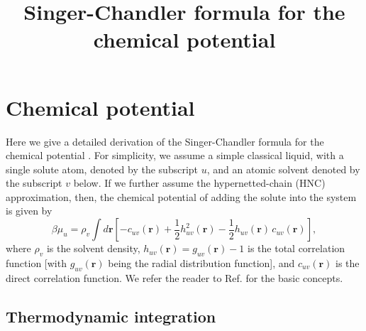 \documentclass[12pt]{article}
\begin{document}
\newcommand{\vct}[1]{\mathbf{#1}}
\newcommand{\vr}{\vct{r}}
\newcommand{\vrN}{\mathbf{r}^N}
\newcommand{\vrn}{\mathbf{r}^n}
\newcommand{\vk}{\vct{k}}
\newcommand{\dvk}{\frac{ d \vk  }{(2\pi)^3}}
\newcommand{\FT}[1]{\tilde{#1}}
\newcommand{\FTc}{\FT{c}}
\newcommand{\FTh}{\FT{h}}

\newcommand{\plam}{\partial_\lambda}
\newcommand{\pbet}{\partial_\beta}



\title{Singer-Chandler formula for the chemical potential}
\author{ \vspace{-10ex} }
\date{ \vspace{-10ex} }
\maketitle



\section{Chemical potential}

Here we give a detailed derivation of the Singer-Chandler formula
  for the chemical potential \cite{singer}.
%
For simplicity, we assume a simple classical liquid,
  with a single solute atom, denoted by the subscript $u$,
  and an atomic solvent denoted by the subscript $v$ below.
%
If we further assume the hypernetted-chain (HNC) approximation,
then, the chemical potential of adding the solute into
  the system is given by
%
\begin{equation}
\beta \mu_u
  =
  \rho_v \int d\vr
  \left[
    - c_{uv}(\vr)
    + \frac{1}{2} h_{uv}^2(\vr)
    - \frac{1}{2} h_{uv}(\vr) \, c_{uv}(\vr)
  \right],
  \label{eq:singer}
\end{equation}
%
where $\rho_v$ is the solvent density,
  $h_{uv}(\vr) = g_{uv}(\vr) - 1$ is the total correlation function
  [with $g_{uv}(\vr)$ being the radial distribution function],
and $c_{uv}(\vr)$ is the direct correlation function.
We refer the reader to Ref. \cite{hansen}
  for the basic concepts.
%



\subsection{Thermodynamic integration}
\end{document}
